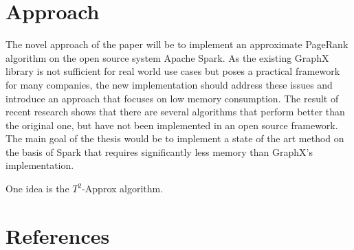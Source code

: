 \documentclass[a4paper,12pt]{article}
\begin{document}
\begin{multicols}{2}
\section{Approach}
The novel approach of the paper will be to implement an approximate PageRank algorithm on the open source system Apache Spark. As the existing GraphX library is not sufficient for real world use cases but poses a practical framework for many companies, the new implementation should address these issues and introduce an approach that focuses on low memory consumption. The result of recent research shows that there are several algorithms that perform better than the original one, but have not been implemented in an open source framework. The main goal of the thesis would be to implement a state of the art method on the basis of Spark that requires significantly less memory than GraphX's implementation. 

One idea is the $T^2$-Approx algorithm. 


\section{References}

\end{multicols}
\end{document}
